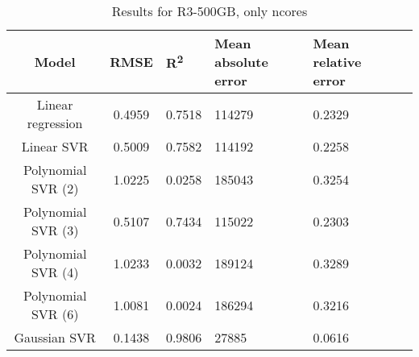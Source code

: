\begin{table}[H]
\centering
\begin{adjustbox}{center}
\begin{tabular}{c | c M{1.2cm} M{2.5cm} M{2.5cm} M{1.8cm}}
Model & RMSE & R\textsuperscript{2} & Mean absolute error & Mean relative error \tabularnewline
\hline
Linear regression & 0.4959 & 0.7518 & 114279 & 0.2329 \\
Linear SVR & 0.5009 & 0.7582 & 114192 & 0.2258 \\
Polynomial SVR (2) & 1.0225 & 0.0258 & 185043 & 0.3254 \\
Polynomial SVR (3) & 0.5107 & 0.7434 & 115022 & 0.2303 \\
Polynomial SVR (4) & 1.0233 & 0.0032 & 189124 & 0.3289 \\
Polynomial SVR (6) & 1.0081 & 0.0024 & 186294 & 0.3216 \\
Gaussian SVR & 0.1438 & 0.9806 &  27885 & 0.0616 \\
\end{tabular}
\end{adjustbox}
\\
\caption{Results for R3-500GB, only ncores}
\label{tab:only_1_linear_R3_500}
\end{table}
